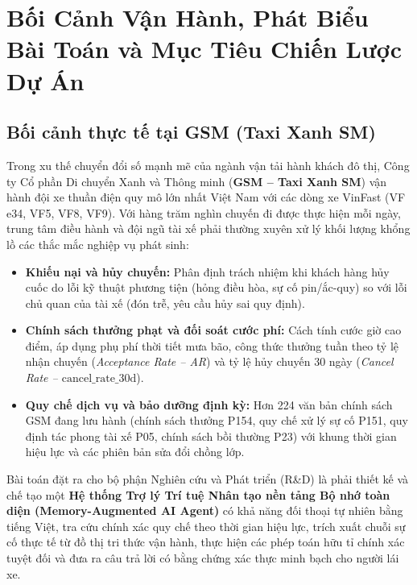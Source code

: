 \documentclass[a4paper,11pt]{article}
\begin{document}
\hypersetup{pageanchor=true}

\tableofcontents
\clearpage

\section{Bối Cảnh Vận Hành, Phát Biểu Bài Toán và Mục Tiêu Chiến Lược Dự Án}
\label{sec:intro}

\subsection{Bối cảnh thực tế tại GSM (Taxi Xanh SM)}
Trong xu thế chuyển đổi số mạnh mẽ của ngành vận tải hành khách đô thị, Công ty Cổ phần Di chuyển Xanh và Thông minh (\textbf{GSM -- Taxi Xanh SM}) vận hành đội xe thuần điện quy mô lớn nhất Việt Nam với các dòng xe VinFast (VF e34, VF5, VF8, VF9). Với hàng trăm nghìn chuyến đi được thực hiện mỗi ngày, trung tâm điều hành và đội ngũ tài xế phải thường xuyên xử lý khối lượng khổng lồ các thắc mắc nghiệp vụ phát sinh:
\begin{itemize}[leftmargin=1.5em,topsep=2pt]
    \item \textbf{Khiếu nại và hủy chuyến:} Phân định trách nhiệm khi khách hàng hủy cuốc do lỗi kỹ thuật phương tiện (hỏng điều hòa, sự cố pin/ắc-quy) so với lỗi chủ quan của tài xế (đón trễ, yêu cầu hủy sai quy định).
    \item \textbf{Chính sách thưởng phạt và đối soát cước phí:} Cách tính cước giờ cao điểm, áp dụng phụ phí thời tiết mưa bão, công thức thưởng tuần theo tỷ lệ nhận chuyến (\textit{Acceptance Rate -- AR}) và tỷ lệ hủy chuyến 30 ngày (\textit{Cancel Rate -- $\text{cancel\_rate\_30d}$}).
    \item \textbf{Quy chế dịch vụ và bảo dưỡng định kỳ:} Hơn 224 văn bản chính sách GSM đang lưu hành (chính sách thưởng P154, quy chế xử lý sự cố P151, quy định tác phong tài xế P05, chính sách bồi thường P23) với khung thời gian hiệu lực và các phiên bản sửa đổi chồng lớp.
\end{itemize}

Bài toán đặt ra cho bộ phận Nghiên cứu và Phát triển (R\&D) là phải thiết kế và chế tạo một \textbf{Hệ thống Trợ lý Trí tuệ Nhân tạo nền tảng Bộ nhớ toàn diện (Memory-Augmented AI Agent)} có khả năng đối thoại tự nhiên bằng tiếng Việt, tra cứu chính xác quy chế theo thời gian hiệu lực, trích xuất chuỗi sự cố thực tế từ đồ thị tri thức vận hành, thực hiện các phép toán hữu tỉ chính xác tuyệt đối và đưa ra câu trả lời có bằng chứng xác thực minh bạch cho người lái xe.
\end{document}
